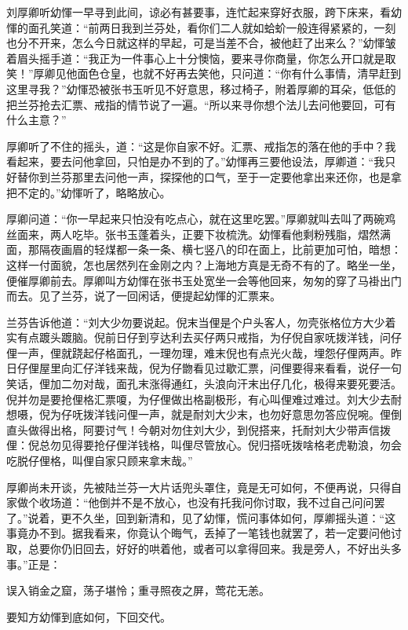 \documentclass[12pt,UTF8]{ctexbook}
\begin{document}
{{{刘厚卿听幼惲一早寻到此间，谅必有甚要事，连忙起来穿好衣服，跨下床来，看幼惲的面孔笑道：“前两日我到兰芬处，看你们二人就如蛤蚧一般连得紧紧的，一刻也分不开来，怎么今日就这样的早起，可是当差不合，被他赶了出来么？”幼惲皱着眉头摇手道：“我正为一件事心上十分懊恼，要来寻你商量，你怎么开口就是取笑！”厚卿见他面色仓皇，也就不好再去笑他，只问道：“你有什么事情，清早赶到这里寻我？”幼惲恐被张书玉听见不好意思，移过椅子，附着厚卿的耳朵，低低的把兰芬抢去汇票、戒指的情节说了一遍。“所以来寻你想个法儿去问他要回，可有什么主意？”

厚卿听了不住的摇头，道：“这是你自家不好。汇票、戒指怎的落在他的手中？我看起来，要去问他拿回，只怕是办不到的了。”幼惲再三要他设法，厚卿道：“我只好替你到兰芬那里去问他一声，探探他的口气，至于一定要他拿出来还你，也是拿把不定的。”幼惲听了，略略放心。

厚卿问道：“你一早起来只怕没有吃点心，就在这里吃罢。”厚卿就叫去叫了两碗鸡丝面来，两人吃毕。张书玉蓬着头，正要下妆梳洗。幼惲看他剩粉残脂，熠然满面，那隔夜画眉的轻煤都一条一条、横七竖八的印在面上，比前更加可怕，暗想：这样一付面貌，怎也居然列在金刚之内？上海地方真是无奇不有的了。略坐一坐，便催厚卿前去。厚卿叫方幼惲在张书玉处宽坐一会等他回来，匆匆的穿了马褂出门而去。见了兰芬，说了一回闲话，便提起幼惲的汇票来。

兰芬告诉他道：“刘大少勿要说起。倪末当俚是个户头客人，勿壳张格位方大少着实有点踱头踱脑。倪前日仔到亨达利去买仔两只戒指，为仔倪自家呒拨洋钱，问仔俚一声，俚就跷起仔格面孔，一理勿理，难末倪也有点光火哉，埋怨仔俚两声。昨日仔俚屋里向汇仔洋钱来哉，倪为仔朆看见过歇汇票，问俚要得来看看，说仔一句笑话，俚加二勿对哉，面孔末涨得通红，头浪向汗末出仔几化，极得来要死要活。倪并勿是要抢俚格汇票嗄，为仔俚做出格副极形，有心叫俚难过难过。刘大少去耐想嗫，倪为仔呒拨洋钱问俚一声，就是耐刘大少末，也勿好意思勿答应倪啘。俚倒直头做得出格，阿要讨气！今朝对勿住刘大少，到倪搭来，托耐刘大少带声信拨俚：倪总勿见得要抢仔俚洋钱格，叫俚尽管放心。倪归搭呒拨啥格老虎勒浪，勿会吃脱仔俚格，叫俚自家只顾来拿末哉。”

厚卿尚未开谈，先被陆兰芬一大片话兜头罩住，竟是无可如何，不便再说，只得自家做个收场道：“他倒并不是不放心，也没有托我问你讨取，我不过自己问问罢了。”说着，更不久坐，回到新清和，见了幼惲，慌问事体如何，厚卿摇头道：“这事竟办不到。据我看来，你竟认个晦气，丢掉了一笔钱也就罢了，若一定要问他讨取，总要你仍旧回去，好好的哄着他，或者可以拿得回来。我是旁人，不好出头多事。”正是：

误入销金之窟，荡子堪怜；重寻照夜之屏，莺花无恙。

要知方幼惲到底如何，下回交代。





}}}
\end{document}
